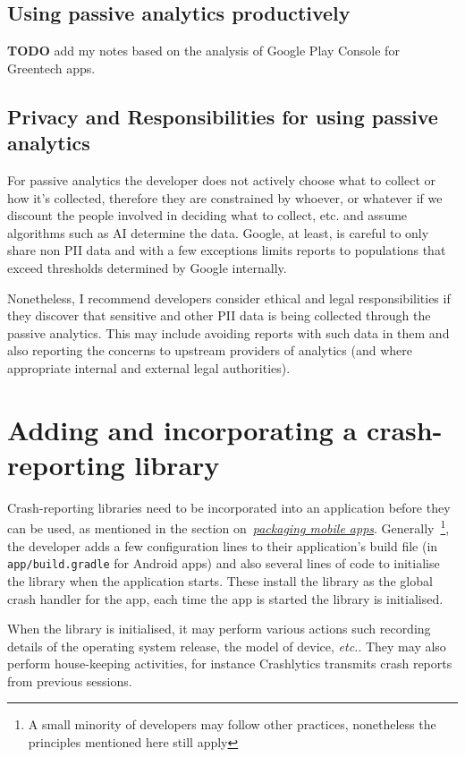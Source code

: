 \subsection{Using passive analytics productively}

\textbf{TODO} add my notes based on the analysis of Google Play Console for Greentech apps.


\subsection{Privacy and Responsibilities for using passive analytics}
For passive analytics the developer does not actively choose what to collect or how it's collected, therefore they are constrained by whoever, or whatever if we discount the people involved in deciding what to collect, etc. and assume algorithms such as AI determine the data. Google, at least, is careful to only share non PII %
data and with a few exceptions limits reports to populations that exceed thresholds determined by Google internally. %

Nonetheless, I recommend developers consider ethical and legal responsibilities if they discover that sensitive and other PII data is being collected through the passive analytics. This may include avoiding reports with such data in them and also reporting the concerns to upstream providers of analytics (and where appropriate internal and external legal authorities).

\section{Adding and incorporating a crash-reporting library}
Crash-reporting libraries need to be incorporated into an application before they can be used, as mentioned in the section on~\href{section-packaging-mobile-apps}{\emph{packaging mobile apps}}. Generally~\footnote{A small minority of developers may follow other practices, nonetheless the principles mentioned here still apply}, the developer adds a few configuration lines to their application's build file (in \texttt{app/build.gradle} for Android apps) and also several lines of code to initialise the library when the application starts. These install the library as the global crash handler for the app, each time the app is started the library is initialised. 

When the library is initialised, it may perform various actions such recording details of the operating system release, the model of device, \emph{etc.}. They may also perform house-keeping activities, for instance Crashlytics transmits crash reports from previous sessions.

